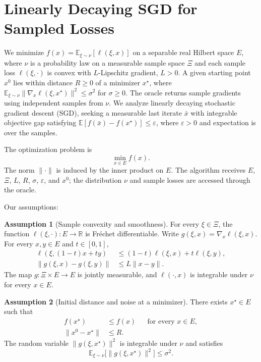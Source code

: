 \documentclass[10pt]{article}
\theoremstyle{definition}
\newtheorem{assumption}{Assumption}
\begin{document}
\section*{Linearly Decaying SGD for Sampled Losses}
We minimize $f(x)=\mathbb{E}_{\xi\sim\nu}[\ell(\xi,x)]$ on a separable real Hilbert space $E$, where $\nu$ is a probability law on a measurable sample space $\Xi$ and each sample loss $\ell(\xi,\cdot)$ is convex with $L$-Lipschitz gradient, $L>0$. A given starting point $x^0$ lies within distance $R\geq0$ of a minimizer $x^\star$, where $\mathbb{E}_{\xi\sim\nu}\|\nabla_x\ell(\xi,x^\star)\|^2\leq\sigma^2$ for $\sigma\geq0$. The oracle returns sample gradients using independent samples from $\nu$. We analyze linearly decaying stochastic gradient descent (SGD), seeking a measurable last iterate $\bar{x}$ with integrable objective gap satisfying $\mathbb{E}[f(\bar{x})-f(x^\star)]\leq\varepsilon$, where $\varepsilon>0$ and expectation is over the samples.

The optimization problem is
\[
\min_{x\in E} f(x).
\]
The norm $\|\cdot\|$ is induced by the inner product on $E$. The algorithm receives $E$, $\Xi$, $L$, $R$, $\sigma$, $\varepsilon$, and $x^0$; the distribution $\nu$ and sample losses are accessed through the oracle.

Our assumptions:
\begin{assumption}[Sample convexity and smoothness]
For every $\xi\in\Xi$, the function $\ell(\xi,\cdot):E\to\mathbb{R}$ is Fr\'echet differentiable. Write $g(\xi,x)=\nabla_x\ell(\xi,x)$. For every $x,y\in E$ and $t\in[0,1]$,
\[
\begin{aligned}
\ell(\xi,(1-t)x+ty)&\leq(1-t)\ell(\xi,x)+t\ell(\xi,y),\\
\|g(\xi,x)-g(\xi,y)\|&\leq L\|x-y\|.
\end{aligned}
\]
The map $g:\Xi\times E\to E$ is jointly measurable, and $\ell(\cdot,x)$ is integrable under $\nu$ for every $x\in E$.
\end{assumption}

\begin{assumption}[Initial distance and noise at a minimizer]
There exists $x^\star\in E$ such that
\[
\begin{aligned}
f(x^\star)&\leq f(x) &&\text{for every }x\in E,\\
\|x^0-x^\star\|&\leq R.
\end{aligned}
\]
The random variable $\|g(\xi,x^\star)\|^2$ is integrable under $\nu$ and satisfies
\[
\mathbb{E}_{\xi\sim\nu}\bigl[\|g(\xi,x^\star)\|^2\bigr]\leq\sigma^2.
\]
\end{assumption}
\end{document}
